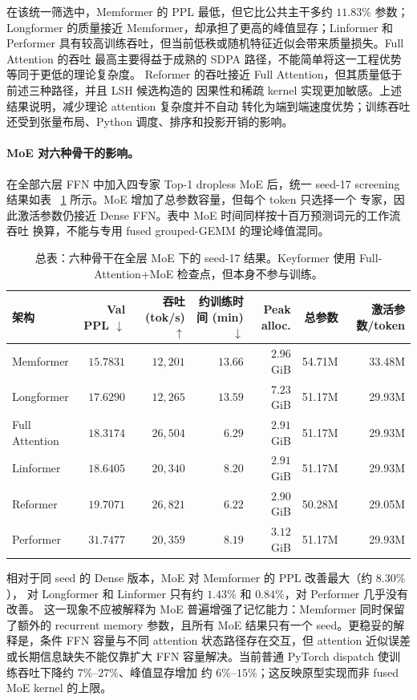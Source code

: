 \documentclass[letterpaper]{article}
\begin{document}
在该统一筛选中，Memformer 的 PPL 最低，但它比公共主干多约 $11.83\%$ 参数；
Longformer 的质量接近 Memformer，却承担了更高的峰值显存；Linformer 和 Performer
具有较高训练吞吐，但当前低秩或随机特征近似会带来质量损失。Full Attention 的吞吐
最高主要得益于成熟的 SDPA 路径，不能简单将这一工程优势等同于更低的理论复杂度。
Reformer 的吞吐接近 Full Attention，但其质量低于前述三种路径，并且 LSH 候选构造的
因果性和稀疏 kernel 实现更加敏感。上述结果说明，减少理论 attention 复杂度并不自动
转化为端到端速度优势；训练吞吐还受到张量布局、Python 调度、排序和投影开销的影响。

\paragraph{MoE 对六种骨干的影响。}
在全部六层 FFN 中加入四专家 Top-1 dropless MoE 后，统一 seed-17 screening 结果如表
~\ref{tab:six-moe-comparison} 所示。MoE 增加了总参数容量，但每个 token 只选择一个
专家，因此激活参数仍接近 Dense FFN。表中 MoE 时间同样按十百万预测词元的工作流吞吐
换算，不能与专用 fused grouped-GEMM 的理论峰值混同。

\begin{table}[t]
\centering
\scriptsize
\caption{总表：六种骨干在全层 MoE 下的 seed-17 结果。Keyformer 使用 Full-Attention+MoE 检查点，但本身不参与训练。}
\label{tab:six-moe-comparison}
\begin{tabular}{l r r r r r r}
\toprule
架构 & Val PPL $\downarrow$ & 吞吐 (tok/s) $\uparrow$ & 约训练时间 (min) $\downarrow$ & Peak alloc. & 总参数 & 激活参数/token \\
\midrule
Memformer & $15.7831$ & $12{,}201$ & $13.66$ & $2.96$ GiB & 54.71M & 33.48M \\
Longformer & $17.6290$ & $12{,}265$ & $13.59$ & $7.23$ GiB & 51.17M & 29.93M \\
Full Attention & $18.3174$ & $26{,}504$ & $6.29$ & $2.91$ GiB & 51.17M & 29.93M \\
Linformer & $18.6405$ & $20{,}340$ & $8.20$ & $2.91$ GiB & 51.17M & 29.93M \\
Reformer & $19.7071$ & $26{,}821$ & $6.22$ & $2.90$ GiB & 50.28M & 29.05M \\
Performer & $31.7477$ & $20{,}359$ & $8.19$ & $3.12$ GiB & 51.17M & 29.93M \\
\bottomrule
\end{tabular}
\end{table}

相对于同 seed 的 Dense 版本，MoE 对 Memformer 的 PPL 改善最大（约 $8.30\%$），
对 Longformer 和 Linformer 只有约 $1.43\%$ 和 $0.84\%$，对 Performer 几乎没有改善。
这一现象不应被解释为 MoE 普遍增强了记忆能力：Memformer 同时保留了额外的 recurrent
memory 参数，且所有 MoE 结果只有一个 seed。更稳妥的解释是，条件 FFN 容量与不同
attention 状态路径存在交互，但 attention 近似误差或长期信息缺失不能仅靠扩大 FFN
容量解决。当前普通 PyTorch dispatch 使训练吞吐下降约 $7\%$--$27\%$、峰值显存增加
约 $6\%$--$15\%$；这反映原型实现而非 fused MoE kernel 的上限。
\end{document}
